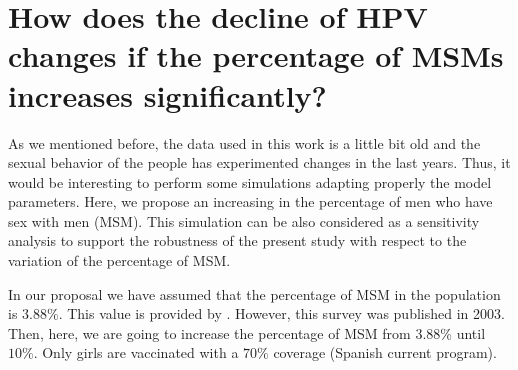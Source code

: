 \section{How does the decline of HPV changes if the percentage of MSMs increases significantly?}
As we mentioned before, the data used in this work is a little bit old and the sexual behavior of the people has experimented changes in the last years. Thus, it would be interesting to perform some simulations adapting properly the model parameters. Here, we propose an increasing in the percentage of men who have sex with men (MSM). This simulation can be also considered as a sensitivity analysis to support the robustness of the present study with respect to the variation of the percentage of MSM.

In our proposal we have assumed that the percentage of MSM in the population is $3.88\%$. This value is provided by \cite{INE}. However, this survey was published in 2003. Then, here, we are going to increase the percentage of MSM from $3.88\%$ until $10\%$. Only girls are vaccinated with a $70\%$ coverage (Spanish current program). 

